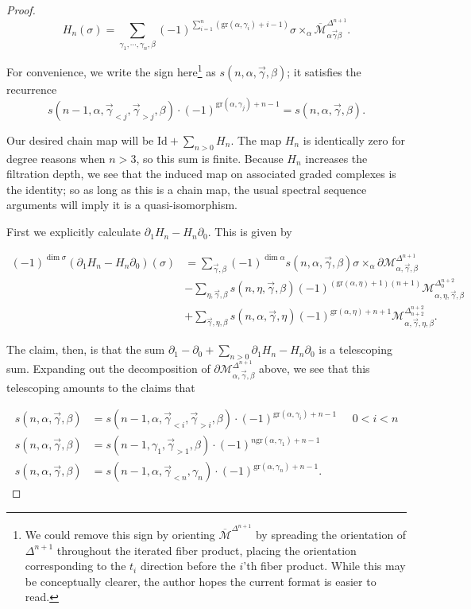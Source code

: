 \documentclass{memo-l}
\theoremstyle{definition}
\theoremstyle{remark}
\numberwithin{section}{chapter}
\numberwithin{equation}{chapter}
\begin{document}
\begin{proof}
$$H_n(\sigma) = \sum_{\gamma_1, \cdots, \gamma_n, \beta} (-1)^{\sum_{i=1}^n (\text{gr}(\alpha, \gamma_i) + i-1)} \sigma \times_\alpha \overline{\mathcal M}^{\Delta^{n+1}}_{\alpha \vec{\gamma} \beta}.$$ 

For convenience, we write the sign here\footnote{We could remove this sign by orienting $\overline{\mathcal M}^{\Delta^{n+1}}$ by spreading the orientation of $\Delta^{n+1}$ throughout the iterated fiber product, placing the orientation corresponding to the $t_i$ direction before the $i$'th fiber product. While this may be conceptually clearer, the author hopes the current format is easier to read.} as $s(n, \alpha, \vec{\gamma}, \beta)$; it satisfies the recurrence 
$$s(n-1, \alpha, \vec{\gamma}_{<j}, \vec{\gamma}_{>j}, \beta) \cdot (-1)^{\text{gr}(\alpha, \gamma_j) + n-1} = s(n, \alpha, \vec{\gamma}, \beta).$$

Our desired chain map will be $\text{Id} + \sum_{n>0} H_n$. The map $H_n$ is identically zero for degree reasons when $n>3$, so this sum is finite. Because $H_n$ increases the filtration depth, we see that the induced map on associated graded complexes is the identity; so as long as this is a chain map, the usual spectral sequence arguments will imply it is a quasi-isomorphism. 

First we explicitly calculate $\partial_1 H_n - H_n \partial_0$. This is given by 

\begin{align*}(-1)^{\dim \sigma}(\partial_1 H_n - H_n \partial_0)(\sigma) &= \sum_{\vec{\gamma}, \beta} (-1)^{\dim \alpha}s(n,\alpha, \vec{\gamma}, \beta) \sigma \times_\alpha \partial \mathcal M^{\Delta^{n+1}}_{\alpha, \vec{\gamma}, \beta}\\
&- \sum_{\eta, \vec{\gamma}, \beta} s(n, \eta, \vec{\gamma}, \beta) (-1)^{(\text{gr}(\alpha, \eta)+1)(n+1)} \mathcal M^{\Delta^{n+2}_0}_{\alpha, \eta, \vec{\gamma}, \beta}\\
&+ \sum_{\vec{\gamma}, \eta, \beta} s(n, \alpha, \vec{\gamma}, \eta) (-1)^{\text{gr}(\alpha, \eta) + n+1} \mathcal M^{\Delta^{n+2}_{n+2}}_{\alpha, \vec{\gamma}, \eta, \beta}.
\end{align*}

The claim, then, is that the sum $\partial_1 - \partial_0 + \sum_{n >0} \partial_1 H_n - H_n \partial_0$ is a telescoping sum. Expanding out the decomposition of $\partial \mathcal M^{\Delta^{n+1}}_{\alpha, \vec{\gamma}, \beta}$ above, we see that this telescoping amounts to the claims that 

\begin{align*}s(n, \alpha, \vec{\gamma}, \beta) &= s(n-1, \alpha, \vec{\gamma}_{<i}, \vec{\gamma}_{>i}, \beta) \cdot (-1)^{\text{gr}(\alpha, \gamma_i)+n-1} \;\;\;\;\; 0 < i < n\\
s(n, \alpha, \vec{\gamma}, \beta) &= s(n-1, \gamma_1, \vec{\gamma}_{>1}, \beta) \cdot (-1)^{n\text{gr}(\alpha, \gamma_1) + n-1}\\
s(n, \alpha, \vec{\gamma}, \beta) &= s(n-1, \alpha, \vec{\gamma}_{<n}, \gamma_n) \cdot (-1)^{\text{gr}(\alpha, \gamma_n)+n-1}.
\end{align*}


\end{proof}
\end{document}
